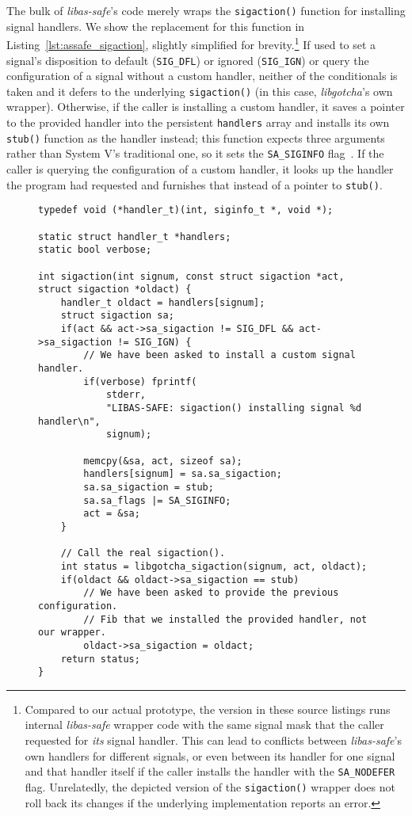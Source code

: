 The bulk of \textit{libas-safe}'s code merely wraps the \texttt{sigaction()} function
for installing signal handlers.  We show the replacement for this function in
Listing~\ref{lst:assafe_sigaction}, slightly simplified for
brevity.\footnote{Compared to our actual prototype, the version in these source
listings runs internal \textit{libas-safe} wrapper code with the same signal mask that
the caller requested for \textit{its} signal handler.  This can lead to conflicts
between \textit{libas-safe}'s own handlers for different signals, or even between its
handler for one signal and that handler itself if the caller installs the handler
with the \texttt{SA\_NODEFER} flag.  Unrelatedly, the depicted version of the
\texttt{sigaction()} wrapper does not roll back its changes if the underlying
implementation reports an error.}  If used to set a signal's disposition to default
(\texttt{SIG\_DFL}) or ignored (\texttt{SIG\_IGN}) or query the configuration of a
signal without a custom handler, neither of the conditionals is taken and it defers
to the underlying \texttt{sigaction()} (in this case, \textit{libgotcha}'s own
wrapper).  Otherwise, if the caller is installing a custom handler, it saves a
pointer to the provided handler into the persistent \texttt{handlers} array and
installs its own \texttt{stub()} function as the handler instead; this function
expects three arguments rather than System V's traditional one, so it sets the
\texttt{SA\_SIGINFO} flag~\cite{sigaction-manpage}.  If the caller is querying the
configuration of a custom handler, it looks up the handler the program had requested
and furnishes that instead of a pointer to \texttt{stub()}.

\begin{figure}[p]
\begin{leftfullpage}
\begin{lstlisting}[label=lst:assafe_sigaction,caption=\textit{libas-safe}'s \texttt{sigaction()} replacement]
typedef void (*handler_t)(int, siginfo_t *, void *);

static struct handler_t *handlers;
static bool verbose;

int sigaction(int signum, const struct sigaction *act, struct sigaction *oldact) {
	handler_t oldact = handlers[signum];
	struct sigaction sa;
	if(act && act->sa_sigaction != SIG_DFL && act->sa_sigaction != SIG_IGN) {
		// We have been asked to install a custom signal handler.
		if(verbose) fprintf(
			stderr,
			"LIBAS-SAFE: sigaction() installing signal %d handler\n",
			signum);

		memcpy(&sa, act, sizeof sa);
		handlers[signum] = sa.sa_sigaction;
		sa.sa_sigaction = stub;
		sa.sa_flags |= SA_SIGINFO;
		act = &sa;
	}

	// Call the real sigaction().
	int status = libgotcha_sigaction(signum, act, oldact);
	if(oldact && oldact->sa_sigaction == stub)
		// We have been asked to provide the previous configuration.
		// Fib that we installed the provided handler, not our wrapper.
		oldact->sa_sigaction = oldact;
	return status;
}
\end{lstlisting}
\end{leftfullpage}
\end{figure}

